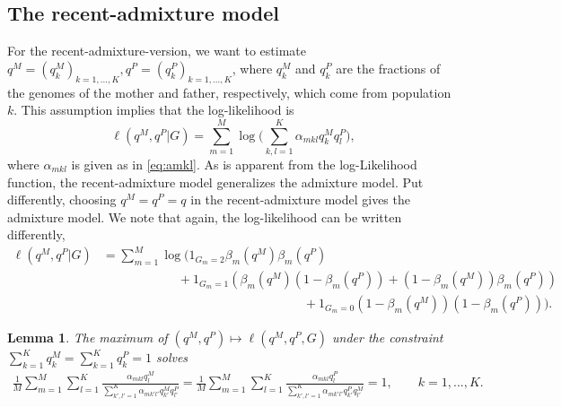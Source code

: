 \documentclass[12pt]{article}
\newtheorem{lemma}{Lemma}[section]
\theoremstyle{definition}
\begin{document}
\subsection{The recent-admixture model}
\noindent
For the recent-admixture-version, we want to estimate
$q^M=(q^M_{k})_{k=1,...,K}, q^P=(q^P_{k})_{k=1,...,K}$, where
$q^M_{k}$ and $q^P_k$ are the fractions of the genomes of the mother
and father, respectively, which come from population $k$.  This
assumption implies that the log-likelihood is
$$ \ell(q^M, q^P|G) = \sum_{m=1}^M  \log\Big(\sum_{k,l=1}^K \alpha_{mkl}q_{k}^M q_l^P\Big),$$
where $\alpha_{mkl}$ is given as in \eqref{eq:amkl}.  As is apparent
from the log-Likelihood function, the recent-admixture model
generalizes the admixture model. Put differently, choosing
$q^M = q^P = q$ in the recent-admixture model gives the admixture
model. We note that again, the log-likelihood can be written
differently,
\begin{equation}
  \begin{aligned}\label{eqSI:logLrecentadmixture}
    \ell(q^M, q^P|G) & = \sum_{m=1}^M  \log\Big( 1_{G_m=2} \beta_m(q^M) \beta_m(q^P)
    \\ & \qquad \qquad \qquad + 1_{G_m=1}(\beta_m(q^M) (1-\beta_m(q^P))
    + (1-\beta_m(q^M)) \beta_m(q^P))
    \\ & \qquad \qquad \qquad \qquad \qquad \qquad \qquad \qquad + 1_{G_m=0}(1-\beta_m(q^M))(1-\beta_m(q^P))\Big).    
  \end{aligned}
\end{equation}

\begin{lemma}\label{l2}
  The maximum of $(q^M, q^P)\mapsto \ell(q^M, q^P,G)$ under the
  constraint $\sum_{k=1}^K q_k^M = \sum_{k=1}^K q_k^P = 1$ solves
  \begin{align}\label{eq:0recent}
    \frac{1}{M}\sum_{m=1}^M \sum_{l=1}^K  \frac{\alpha_{mkl}q_l^M}{\sum_{k',l'=1}^K \alpha_{mk'l'}q^M_{k'}q^P_{l'}}
    = \frac{1}{M}\sum_{m=1}^M \sum_{l=1}^K\frac{\alpha_{mkl}q_l^P}{\sum_{k',l'=1}^K \alpha_{mk'l'}q^P_{k'}q^M_{l'}} = 1, \qquad k=1,...,K.
  \end{align}
\end{lemma}

\end{document}

